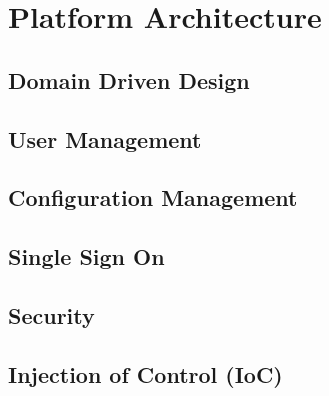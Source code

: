 \chapter{Platform Architecture}\label{ch:01}

\section{Domain Driven Design}

\section{User Management}

\section{Configuration Management}

\section{Single Sign On}

\section{Security}

\section{Injection of Control (IoC)}  
